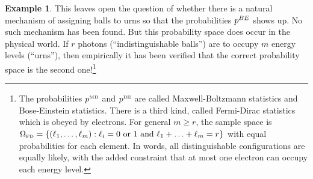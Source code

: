 \documentclass[preprint,  11pt]{amsart}
\theoremstyle{plain} %
\theoremstyle{definition} %
\newtheorem{example}[theorem]{Example}
\begin{document}
\begin{example}
This leaves open the question of whether there is a natural mechanism of assigning balls to urns so that the probabilities $p^{\tiny BE}$ shows up. No such mechanism has been found. But this probability space does occur in the physical world. If $r$ photons (``indistinguishable balls'') are to occupy $m$ energy levels (``urns''), then empirically it has been verified that the correct probability space is the second one!\footnote{The probabilities $p^{\mbox{\tiny MB}}$ and $p^{\mbox{\tiny BE}}$ are called Maxwell-Boltzmann statistics and Bose-Einstein statistics. There is a third kind, called Fermi-Dirac statistics which is obeyed by electrons. For general $m\ge r$,  the sample space is $\Omega_{\mbox{\tiny FD}}=\{(\ell_{1},\ldots ,\ell_{m}){\; : \;} \ell_{i}=0 \mbox{ or }1 \mbox{ and }\ell_{1}+\ldots +\ell_{m}=r\}$ with equal probabilities for each element. In words, all distinguishable configurations are equally likely, with the added constraint that at most one electron can occupy each energy level.}
\end{example}
\end{document}
